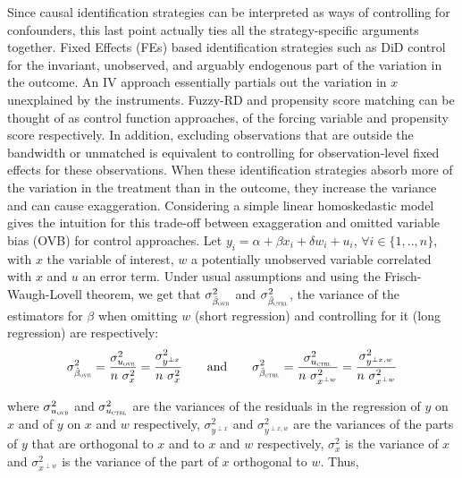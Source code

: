 			Since causal identification strategies can be interpreted as ways of controlling for confounders, this last point actually ties all the strategy-specific arguments together. Fixed Effects (FEs) based identification strategies such as DiD control for the invariant, unobserved, and arguably endogenous part of the variation in the outcome. An IV approach essentially partials out the variation in $x$ unexplained by the instruments. %
			 Fuzzy-RD and propensity score matching can be thought of as control function approaches, of the forcing variable and propensity score respectively. In addition, excluding observations that are outside the bandwidth or unmatched is equivalent to controlling for observation-level fixed effects for these observations. When these identification strategies absorb more of the variation in the treatment than in the outcome, they increase the variance and can cause exaggeration. 
			 Considering a simple linear homoskedastic model gives the intuition for this trade-off between exaggeration and omitted variable bias (OVB) for control approaches.  Let $y_{i} = \alpha + \beta x_{i} + \delta w_{i} + u_{i}$, $\forall i \in \{1, .., n\}$,  with $x$ the variable of interest, $w$ a potentially unobserved variable correlated with $x$ and $u$ an error term. Under usual assumptions and using the Frisch-Waugh-Lovell theorem, we get that $ \sigma_{\hat{\beta}_{\textsc{ovb}}}^2$ and $ \sigma_{\hat{\beta}_{\textsc{ctrl}}}^2$, the variance of the estimators for $\beta$ when omitting $w$ (short regression) and controlling for it (long regression) are respectively:
			~
			\[
				\sigma_{\hat{\beta}_{\textsc{ovb}}}^2 =
				 \dfrac{\sigma^{2}_{u_{\textsc{ovb}}}}{n \ \sigma_{x}^{2}} =
				 \dfrac{\sigma^{2}_{y^{\perp x}}}{n \ \sigma_{x}^{2}}
				 \qquad \text{and} \qquad
				 \sigma_{\hat{\beta}_{\textsc{ctrl}}}^2 = 
				 \dfrac{\sigma^{2}_{u_{\textsc{ctrl}}}}{n \ \sigma_{x^{\perp w}}^{2}} =
				  \dfrac{\sigma^{2}_{y^{\perp x, w}}}{n \ \sigma_{x^{\perp w}}^{2}}
			\]
			
			where $\sigma^{2}_{u_{\textsc{ovb}}}$ and $\sigma^{2}_{u_{\textsc{ctrl}}}$ are the variances of the residuals in the regression of $y$ on $x$ and of $y$ on $x$ and $w$ respectively, $\sigma^{2}_{y^{\perp x}}$ and $\sigma^{2}_{y^{\perp x, w}}$ are the variances of the parts of $y$ that are orthogonal to $x$ and to $x$ and $w$ respectively, $\sigma^{2}_{x}$ is the variance of $x$ and $\sigma^{2}_{x^{\perp w}}$ is the variance of the part of $x$ orthogonal to $w$. Thus,
			
